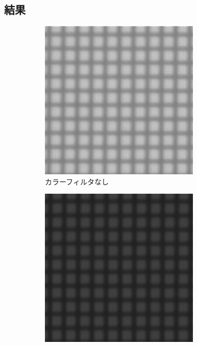 \documentclass[titlepage]{jsarticle}
\begin{document}
\subsection{結果}

\begin{figure}[htbp]
    \centering
    \begin{subfigure}{0.3\columnwidth}
        \centering
        \includegraphics[width=\columnwidth]{20um_white_tri.png}
        \caption{カラーフィルタなし}
        \label{fig:20white}
    \end{subfigure}
    \begin{subfigure}{0.3\columnwidth}
        \centering
        \includegraphics[width=\columnwidth]{20um_red2_tri.png}

\end{subfigure}
\end{figure}
\end{document}
